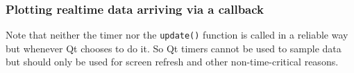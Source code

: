 \documentclass[xcolor=dvipsnames]{beamer}
\begin{document}
\begin{frame}[fragile]
\frametitle{Plotting realtime data arriving via a callback}
Note that neither the timer nor the \texttt{update()} function
is called in a reliable way but whenever Qt chooses to do it.
So Qt timers cannot be used to sample data but should
only be used for screen refresh and other non-time-critical
reasons.
\end{frame}
\end{document}
